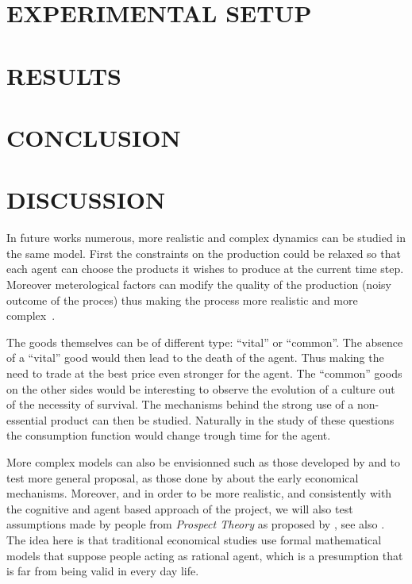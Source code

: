\documentclass{wscpaperproc}
\begin{document}
\section{EXPERIMENTAL SETUP}

\section{RESULTS}

\section{CONCLUSION}

\section{DISCUSSION}


In future works numerous, more realistic and complex dynamics can be studied in the same model. First the constraints on the production could be relaxed so that each agent can choose the products it wishes to produce at the current time step. Moreover meterological factors can modify the quality of the production (noisy outcome of the proces) thus making the process more realistic and more complex~\cite{bentley_specialisation_2005}.

The goods themselves can be of different type: ``vital'' or ``common''. The absence of a ``vital'' good would then lead to the death of the agent. Thus making the need to trade at the best price even stronger for the agent. The ``common'' goods on the other sides would be interesting to observe the evolution of a culture out of the necessity of survival. The mechanisms behind the strong use of a non-essential product can then be studied. Naturally in the study of these questions the consumption function would change trough time for the agent.

More complex models can also be envisionned such as those developed by 
\cite{rubinstein_equilibrium_1985} and to test more general proposal, as those done by \cite{polanyi_trade_1957,polanyi_livelihood_1977} about the early economical mechanisms. Moreover, and in order to be more realistic, and consistently with the cognitive and agent based approach of the project, we will also test assumptions made by people from \emph{Prospect Theory} as proposed by 
\cite{kahneman_prospect_1979}, see also
\cite{camerer_prospect_2004}. The idea here is that traditional economical studies use formal mathematical models that suppose people acting as rational agent, which is a presumption that is far from being valid  in every day life. 
\end{document}
